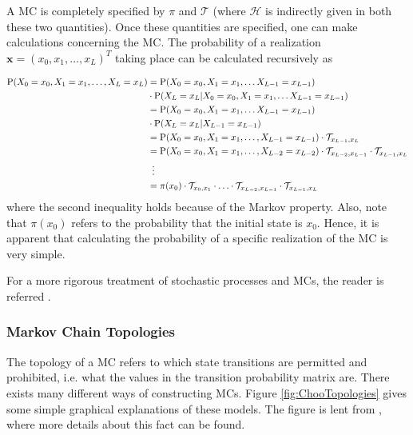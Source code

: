 \documentclass{article}\usepackage[]{graphicx}\usepackage[]{color}
\begin{document}
A MC is completely specified by $\pi$ and $\mathcal{T}$ (where $\mathcal{H}$ is indirectly given in both these two quantities). Once these quantities are specified, one can make calculations concerning the MC. The probability of a realization $\mathbf{x} = (x_0, x_1, \ldots, x_L)^T$ taking place can be calculated recursively as 

\begin{align*}
    \text{P}(X_0 = x_0, X_1 = x_1, \ldots, X_L = x_L) &= \text{P}(X_0 = x_0, X_1 = x_1, \ldots X_{L-1} = x_{L-1})\\ 
    &\cdot\text{P}(X_L = x_L|X_0 = x_0, X_1 = x_1, \ldots X_{L-1} = x_{L-1}) \\ 
    &= \text{P}(X_0 = x_0, X_1 = x_1, \ldots X_{L-1} = x_{L-1})\\&\cdot\text{P}(X_L = x_L|X_{L-1} = x_{L-1}) \\ 
    &= \text{P}(X_0 = x_0, X_1 = x_1, \ldots, X_{L-1} = x_{L-1})\cdot\mathcal{T}_{x_{L-1}, x_L} \\ 
    &= \text{P}(X_0 = x_0, X_1 = x_1, \ldots, X_{L-2} = x_{L-2})\cdot \mathcal{T}_{x_{L-2}, x_{L-1}}\cdot\mathcal{T}_{x_{L-1}, x_L} \\ & \hspace{0.5em}\vdots \\ &= \pi(x_0)\cdot\mathcal{T}_{x_0,x_1}\cdot \ldots \cdot \mathcal{T}_{x_{L-2}, x_{L-1}} \cdot\mathcal{T}_{x_{L-1}, x_L}
\end{align*}
where the second inequality holds because of the Markov property. Also, note that $\pi(x_0)$ refers to the probability that the initial state is $x_0$. Hence, it is apparent that calculating the probability of a specific realization of the MC is very simple. 

For a more rigorous treatment of stochastic processes and MCs, the reader is referred \cite{Pinsky2011}.

\subsubsection{Markov Chain Topologies}
The topology of a MC refers to which state transitions are permitted and prohibited, i.e. what the values in the transition probability matrix are. There exists many different ways of constructing MCs. Figure \ref{fig:ChooTopologies} gives some simple graphical explanations of these models. The figure is lent from \cite{Choo2004}, where more details about this fact can be found. 
\end{document}
